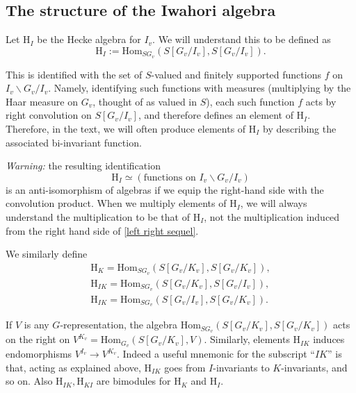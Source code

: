 \documentclass[10pt]{amsart}
\newcommand{\changecolor}{black}
\newcommand{\Hom}{\mathrm{Hom}}
\theoremstyle{remark}
\begin{document}
 \subsection{The structure of the Iwahori algebra} \label{Iwahori}   
   {\color{\changecolor} Let $\mathrm{H}_I$ be the Hecke algebra for $I_v$.
   We will understand this to be defined as
   $$ \mathrm{H}_I  := \Hom_{SG_v}(S[G_v/I_v], S[G_v/I_v]).$$

This is identified with the 
set of
 $S$-valued and finitely supported functions $f$  on $I_v \backslash G_v/I_v$. Namely, 
 identifying such functions with measures (multiplying by the Haar measure on $G_v$, thought
 of as valued in $S$), each such 
function $f$ acts by right convolution on $S[G_v/I_v]$, and therefore defines an element of $\mathrm{H}_I$. 
    
Therefore, in the text, we will often produce elements of $\mathrm{H}_I$ by describing
the associated bi-invariant function. 

{\em Warning:} the resulting identification
\begin{equation} \label{left right sequel} \mathrm{H}_I \simeq \left(\mbox{functions on $I_v \backslash G_v/I_v$} \right)\end{equation}
is an anti-isomorphism of algebras if we equip the right-hand side with the convolution product.  
When we multiply elements of $\mathrm{H}_I$, we will always understand the multiplication to be that of $\mathrm{H}_I$,
not the multiplication induced from the right hand side of \eqref{left right sequel}. 

We similarly define 
\begin{eqnarray*} \label{HKIdef} \mathrm{H}_K  =  \Hom_{SG_v}(S[G_v/K_v], S[G_v/K_v]), \\
 \mathrm{H}_{IK} = \Hom_{SG_v} (S[G_v/K_v], S[G_v/I_v]), \\ 
  \mathrm{H}_{IK} = \Hom_{SG_v} (S[G_v/I_v], S[G_v/K_v]).
\end{eqnarray*}

If $V$ is any $G$-representation, the algebra  $ \Hom_{SG_v}(S[G_v/K_v], S[G_v/K_v])$ 
acts on the right on $V^{K_v} = \Hom_{G_v}(S[G_v/K_v], V)$. Similarly, elements $\mathrm{H}_{IK}$
induces endomorphisms  $V^{I_v} \rightarrow V^{K_v}$. 
Indeed a useful mnemonic for    the subscript ``$IK$''  is that,  acting as explained above,   $\mathrm{H}_{IK}$ goes from $I$-invariants to $K$-invariants, and so on.
Also   $\mathrm{H}_{IK}, \mathrm{H}_{KI}$  are bimodules for $\mathrm{H}_K$ and $\mathrm{H}_I$. 


}
\end{document}
